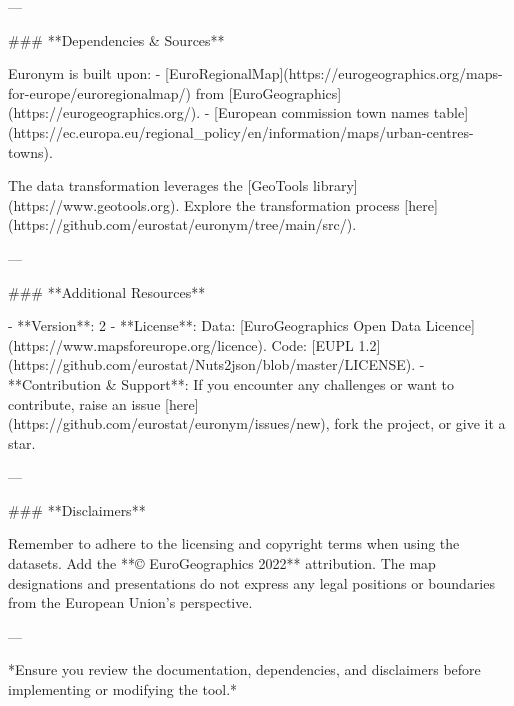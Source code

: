 ---

### **Dependencies & Sources**

Euronym is built upon:
- [EuroRegionalMap](https://eurogeographics.org/maps-for-europe/euroregionalmap/) from [EuroGeographics](https://eurogeographics.org/).
- [European commission town names table](https://ec.europa.eu/regional_policy/en/information/maps/urban-centres-towns).
    
The data transformation leverages the [GeoTools library](https://www.geotools.org). Explore the transformation process [here](https://github.com/eurostat/euronym/tree/main/src/).

---

### **Additional Resources**

- **Version**: 2
- **License**: Data: [EuroGeographics Open Data Licence](https://www.mapsforeurope.org/licence). Code: [EUPL 1.2](https://github.com/eurostat/Nuts2json/blob/master/LICENSE).
- **Contribution & Support**: If you encounter any challenges or want to contribute, raise an issue [here](https://github.com/eurostat/euronym/issues/new), fork the project, or give it a star.

---

### **Disclaimers**

Remember to adhere to the licensing and copyright terms when using the datasets. Add the **© EuroGeographics 2022** attribution. The map designations and presentations do not express any legal positions or boundaries from the European Union's perspective.

---

*Ensure you review the documentation, dependencies, and disclaimers before implementing or modifying the tool.*